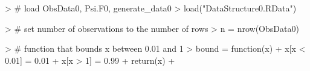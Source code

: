 \documentclass[answers]{exam}
\begin{document}
\begin{solution}
\begin{Schunk}
\begin{Sinput}
> # load ObsData0, Psi.F0, generate_data0
> load("DataStructure0.RData")
\end{Sinput}
\end{Schunk}
\begin{Schunk}
\begin{Sinput}
> # set number of observations to the number of rows
> n = nrow(ObsData0)
\end{Sinput}
\end{Schunk}
\begin{Schunk}
\begin{Sinput}
> # function that bounds x between 0.01 and 1
> bound = function(x){
+   x[x < 0.01] = 0.01
+   x[x > 1] = 0.99
+   return(x)
+ }
\end{Sinput}
\end{Schunk}
\end{solution}
\end{document}
